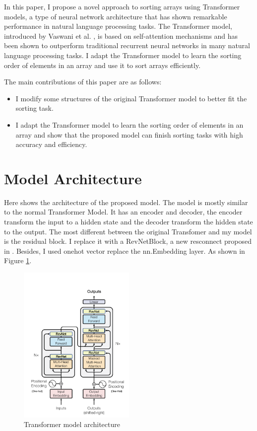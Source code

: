 \documentclass{article}
\begin{document}
In this paper, I propose a novel approach to sorting arrays using Transformer models, a type of neural network architecture that has shown remarkable performance in natural language processing tasks. The Transformer model, introduced by Vaswani et al. \cite{vaswani2017attention}, is based on self-attention mechanisms and has been shown to outperform traditional recurrent neural networks in many natural language processing tasks. I adapt the Transformer model to learn the sorting order of elements in an array and use it to sort arrays efficiently.

The main contributions of this paper are as follows:
\begin{itemize}
    \item I modify some structures of the original Transformer model to better fit the sorting task.
    \item I adapt the Transformer model to learn the sorting order of elements in an array and show that the proposed model can finish sorting tasks with high accuracy and efficiency.
\end{itemize}


\section{Model Architecture}
Here shows the architecture of the proposed model. The model is mostly similar to the normal Transformer Model. It has an encoder and decoder, the encoder transform the input to a hidden state and the decoder transform the hidden state to the output. The most different between the original Transfomer and my model is the residual block. I replace it with a RevNetBlock, a new resconnect proposed in \cite{RevNet}. Besides, I used onehot vector replace the nn.Embedding layer. As shown in Figure \ref{Transformer model architecture}.

\begin{figure}
    \centering
    \includegraphics[width=0.5\textwidth]{picture/transformer.png}
    \caption{Transformer model architecture}
    \label{Transformer model architecture}
\end{figure}
\end{document}
